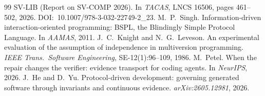\documentclass[11pt]{article}
\theoremstyle{definition}
\theoremstyle{remark}
\begin{document}
\begin{thebibliography}{99}
SV-LIB (Report on SV-COMP 2026). In \emph{TACAS}, LNCS 16506, pages 461--502, 2026.
DOI:~10.1007/978-3-032-22749-2\_23.
 M.~P.~Singh. Information-driven interaction-oriented programming: BSPL, the
Blindingly Simple Protocol Language. In \emph{AAMAS}, 2011.
 J.~C.~Knight and N.~G.~Leveson. An experimental evaluation of the assumption of
independence in multiversion programming. \emph{IEEE Trans.\ Software Engineering}, SE-12(1):96--109,
1986.
 M.~Petel. When the repair changes the verifier: evidence transport for coding
agents. In \emph{NeurIPS}, 2026.
 J.~He and D.~Yu. Protocol-driven development: governing generated software through
invariants and continuous evidence. \emph{arXiv:2605.12981}, 2026.
\end{thebibliography}
\end{document}
